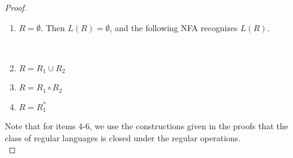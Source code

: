 \documentclass[11pt,a4paper]{article}
\begin{document}
\begin{lemma}
\begin{proof}
\begin{enumerate}
 \\

            \item $R=\emptyset$. Then $L(R)=\emptyset$, and the following NFA recognizes $L(R)$. \\
            
             \\
            
            \item $R=R_1\cup R_2$
            \item $R=R_1\circ R_2$
            \item $R=R_1^*$
        \end{enumerate}

        Note that for items 4-6, we use the constructions given in the proofs that the class of regular languages is closed under the regular operations. \\
    \end{proof}
\end{lemma}
\end{document}
